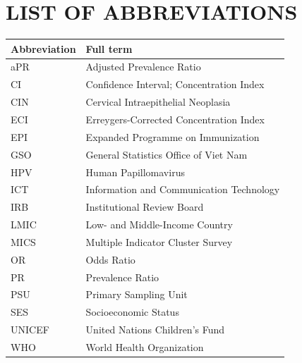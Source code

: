 \chapter*{LIST OF ABBREVIATIONS}
{}

\begin{table}[htbp]
\centering
\begin{tabular}{|p{3.0cm}|p{10.2cm}|}
\hline
\textbf{Abbreviation} & \textbf{Full term} \\
\hline
aPR & Adjusted Prevalence Ratio \\
CI & Confidence Interval; Concentration Index \\
CIN & Cervical Intraepithelial Neoplasia \\
ECI & Erreygers-Corrected Concentration Index \\
EPI & Expanded Programme on Immunization \\
GSO & General Statistics Office of Viet Nam \\
HPV & Human Papillomavirus \\
ICT & Information and Communication Technology \\
IRB & Institutional Review Board \\
LMIC & Low- and Middle-Income Country \\
MICS & Multiple Indicator Cluster Survey \\
OR & Odds Ratio \\
PR & Prevalence Ratio \\
PSU & Primary Sampling Unit \\
SES & Socioeconomic Status \\
UNICEF & United Nations Children's Fund \\
WHO & World Health Organization \\
\hline
\end{tabular}
\end{table}

\clearpage
